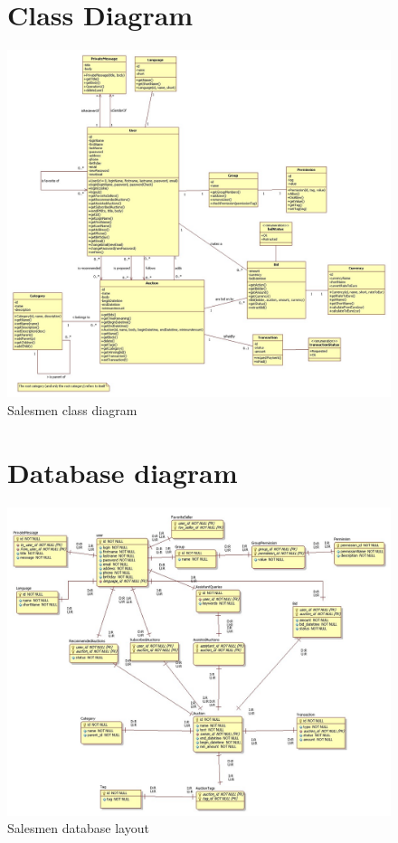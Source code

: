 \documentclass[salesmen, twoside]{../../../templates/latex/2009/softproj}
\begin{document}
\begin{projdoc}
\begin{figure}
\section{Class Diagram}
\label{fig_class}
\includegraphics[scale=0.35,angle=90]{../../img/class1.jpg}
\caption{Salesmen class diagram}
\end{figure}

\begin{figure}
\section{Database diagram}
\label{fig_database}
\includegraphics[scale=0.44,angle=90]{../../img/erd1.jpg}
\caption{Salesmen database layout}
\end{figure}


\end{projdoc}
\end{document}
